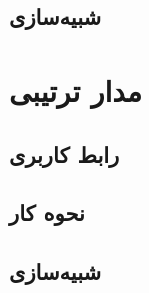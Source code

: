 \documentclass[12pt,onecolumn,a4paper,fleqn]{article}
\begin{document}
	\subsection{شبیه‌سازی}
	\pagebreak
	\section{مدار ترتیبی}
	\subsection{رابط کاربری}
	\subsection{نحوه کار}
	\subsection{شبیه‌سازی}
\end{document}
